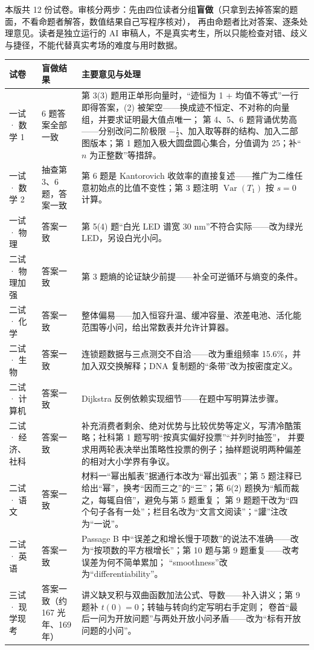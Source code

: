 本版共 12 份试卷。审核分两步：先由四位读者分组\textbf{盲做}（只拿到去掉答案的题面，不看命题者解答，数值结果自己写程序核对），
再由命题者比对答案、逐条处理意见。读者是独立运行的 AI 审稿人，不是真实考生，所以只能检查对错、歧义与捷径，不能代替真实考场的难度与用时数据。

{\small
\begin{longtable}{p{2.3cm}p{3.6cm}p{7.6cm}}
\toprule
试卷 & 盲做结果 & 主要意见与处理 \\
\midrule
\endhead
一试 · 数学 1 & 6 题答案全部一致 & 第 3(3) 题用正单形向量时，“迹恒为 1 + 均值不等式”一行即得答案，(2) 被架空——换成迹不恒定、不对称的向量组，并要求证明最大值点唯一；
第 4、5、6 题背诵优势高——分别改问二阶极限 $-\frac12$、加入取等群的结构、加入二部图版本；第 1 题加入极大圆盘圆心集合，分值调为 25；补“$n$ 为正整数”等措辞。 \\
一试 · 数学 2 & 抽查第 3、6 题，答案一致 & 第 6 题是 Kantorovich 收敛率的直接复述——推广为二维任意初始点的比值不变性；第 3 题注明 $\operatorname{Var}(T_1)$ 按 $s=0$ 计算。 \\
一试 · 物理 & 答案一致 & 第 5(4) 题“白光 LED 谱宽 30 nm”不符合实际——改为绿光 LED，另设白光小问。 \\
二试 · 物理加强 & 答案一致 & 第 3 题熵的论证缺少前提——补全可逆循环与熵变的条件。 \\
二试 · 化学 & 答案一致 & 整体偏易——加入恒容升温、缓冲容量、浓差电池、活化能范围等小问，给出常数表并允许计算器。 \\
二试 · 生物 & 答案一致 & 连锁题数据与三点测交不自洽——改为重组频率 15.6\%，并加入双交换解释；DNA 复制题的“条带”改为按密度定义。 \\
二试 · 计算机 & 答案一致 & Dijkstra 反例依赖实现细节——在题中写明算法步骤。 \\
二试 · 经济、社科 & 答案一致 & 补充消费者剩余、绝对优势与比较优势等定义，写清冷酷策略；社科第 1 题写明“按真实偏好投票”“并列时抽签”，
并要求用两轮表决举出策略性投票的例子；抽样题说明两种偏差的相对大小学界有争议。 \\
二试 · 语文 & 答案一致 & 材料一“幂出觚表”据通行本改为“幂出弧表”；第 5 题注释已给出“幂”，换考“因而三之”的“三”；第 6(2) 题换为“觚而裁之，每辄自倍”，避免与第 5 题重复；
第 9 题题干改为“四个句子各有一处”；栏目名改为“文言文阅读”；“讙”注改为“一说”。 \\
二试 · 英语 & 答案一致 & Passage B 中“误差之和增长慢于项数”的说法不准确——改为“按项数的平方根增长”；第 10 题与第 9 题重复——改考误差为何不简单累加；
“smoothness”改为“differentiability”。 \\
三试 · 现学现考 & 答案一致（约 167 光年、169 年） & 讲义缺叉积与双曲函数加法公式、导数——补入讲义；第 9 题补 $t(0)=0$；转轴与转向约定写明右手定则；
卷首“最后一问为开放问题”与两处开放小问矛盾——改为“标有开放问题的小问”。 \\
\bottomrule
\end{longtable}
}

